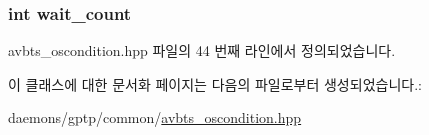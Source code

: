 \subsubsection[{\texorpdfstring{wait\+\_\+count}{wait_count}}]{\setlength{\rightskip}{0pt plus 5cm}int wait\+\_\+count\hspace{0.3cm}{\ttfamily [private]}}\hypertarget{class_o_s_condition_a3f608c86f5674663aa19921c25cce926}{}\label{class_o_s_condition_a3f608c86f5674663aa19921c25cce926}


avbts\+\_\+oscondition.\+hpp 파일의 44 번째 라인에서 정의되었습니다.



이 클래스에 대한 문서화 페이지는 다음의 파일로부터 생성되었습니다.\+:\begin{DoxyCompactItemize}
\item 
daemons/gptp/common/\hyperlink{avbts__oscondition_8hpp}{avbts\+\_\+oscondition.\+hpp}\end{DoxyCompactItemize}

